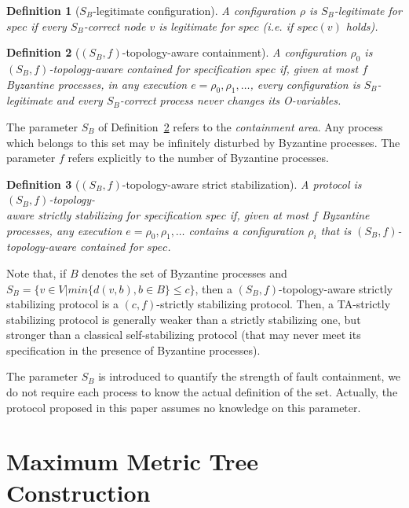 \documentclass[11pt]{article}
\newtheorem{defi}{Definition}
\newenvironment{definition}[1]{\vspace{-0.25cm}\begin{defi}#1}{\end{defi}\vspace{-0.3cm}}
\begin{document}
\begin{definition}[$S_{B}$-legitimate configuration]
A configuration $\rho$ is \emph{$S_{B}$-legitimate} for $spec$ if every $S_{B}$-correct node $v$ is legitimate for $spec$ (\emph{i.e.} if $spec(v)$ holds).
\end{definition}

\begin{definition}[$(S_{B},f)$-topology-aware containment]
\label{def:SfTAcontained}
A configuration $\rho_{0}$ is \emph{$(S_{B},f)$-topology-aware contained} for specification $spec$ if, given at most $f$ Byzantine processes, in any execution $e=\rho_0,\rho_1,\ldots$, every configuration is $S_{B}$-legitimate and every $S_B$-correct process never changes its O-variables. 
\end{definition}

The parameter $S_{B}$ of Definition~\ref{def:SfTAcontained} refers to the \emph{containment area}. Any process which belongs to this set may be infinitely disturbed by Byzantine processes. The parameter $f$ refers explicitly to the number of Byzantine processes.

\begin{definition}[$(S_{B},f)$-topology-aware strict stabilization]
\label{def:SfTAStrictstabilizing}
A protocol is \emph{$(S_{B},f)$-topology-\\\noindent aware strictly stabilizing} for specification $spec$ if, given at most $f$ Byzantine processes, any execution $e=\rho_0,\rho_1,\ldots$ contains a configuration $\rho_i$ that is $(S_{B},f)$-topology-aware contained for $spec$.
\end{definition}

Note that, if $B$ denotes the set of Byzantine processes and $S_{B}=\{v\in V|min\{d(v,b),b\in B\}\leq c\}$, then a $(S_{B},f)$-topology-aware strictly stabilizing protocol is a $(c,f)$-strictly stabilizing protocol. Then, a TA-strictly stabilizing protocol is generally weaker than a strictly stabilizing one, but stronger than a classical self-stabilizing protocol (that may never meet its specification in the presence of Byzantine processes).

The parameter $S_{B}$ is introduced to quantify the strength of fault containment, we do not require each process to know the actual definition of the set. Actually, the protocol proposed in this paper assumes no knowledge on this parameter.

\section{Maximum Metric Tree Construction}
\end{document}
